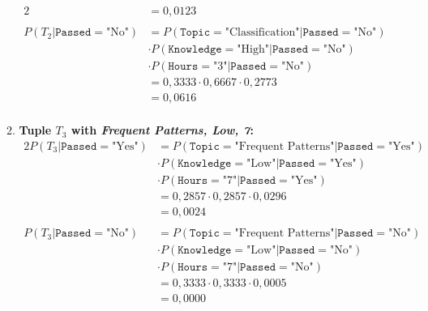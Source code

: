 \documentclass[
english,
smallborders
]{i6prcsht}
\newcommand{\Likelihood}[4]{P(\texttt{#1}=\text{"#2"} | \texttt{#3}=\text{"#4"})}
\newcommand{\LikelihoodTuple}[3]{P(#1 | \texttt{#2}=\text{"#3"})}
\begin{document}
\begin{solution}
\begin{enumerate}
\begin{enumerate}
\begin{alignat*}{2}
				                                               & = 0,0123                                           \\
				                                               &                                                    \\
				            \LikelihoodTuple{T_2}{Passed}{No}  & =  \Likelihood{Topic}{Classification}{Passed}{No}  \\
				                                               & \cdot \Likelihood{Knowledge}{High}{Passed}{No}     \\
				                                               & \cdot \Likelihood{Hours}{3}{Passed}{No}            \\
				                                               & =  0,3333 \cdot 0,6667 \cdot 0,2773                \\
				                                               & = 0,0616                                           \\
			            \end{alignat*}

			      \item \textbf{Tuple $T_3$ with \textit{Frequent Patterns, Low, 7}:}
			            \begin{alignat*}{2}
				            \LikelihoodTuple{T_3}{Passed}{Yes} & =  \Likelihood{Topic}{Frequent Patterns}{Passed}{Yes} \\
				                                               & \cdot \Likelihood{Knowledge}{Low}{Passed}{Yes}        \\
				                                               & \cdot \Likelihood{Hours}{7}{Passed}{Yes}              \\
				                                               & =  0,2857 \cdot 0,2857 \cdot 0,0296                   \\
				                                               & = 0,0024                                              \\
				                                               &                                                       \\
				            \LikelihoodTuple{T_3}{Passed}{No}  & =  \Likelihood{Topic}{Frequent Patterns}{Passed}{No}  \\
				                                               & \cdot \Likelihood{Knowledge}{Low}{Passed}{No}         \\
				                                               & \cdot \Likelihood{Hours}{7}{Passed}{No}               \\
				                                               & =  0,3333 \cdot 0,3333 \cdot 0,0005                   \\
				                                               & = 0,0000                                              \\
			            \end{alignat*}
		      \end{enumerate}


\end{enumerate}
\end{solution}
\end{document}
